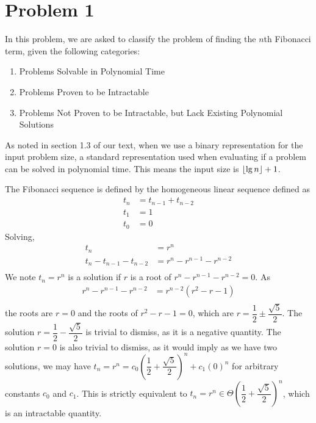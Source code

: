 \section*{Problem 1}

In this problem, we are asked to classify the problem of finding the $n$th Fibonacci term, given the following categories:
\begin{enumerate}
    \item Problems Solvable in Polynomial Time
    \item Problems Proven to be Intractable
    \item Problems Not Proven to be Intractable, but Lack Existing Polynomial Solutions
\end{enumerate}

As noted in section 1.3 of our text, when we use a binary representation for the input problem size, a standard representation used when evaluating if a problem can be solved in polynomial time. This means the input size is $\lfloor\lg n\rfloor + 1$.

The Fibonacci sequence is defined by the homogeneous linear sequence defined as
\begin{align*}
    t_n &= t_{n-1} + t_{n-2}\\
    t_1 &= 1\\
    t_0 &= 0
\end{align*}
Solving,
\begin{align*}
    t_n &= r^n\\
    t_n - t_{n-1} - t_{n-2} &= r^n - r^{n-1} - r^{n-2}\\
\end{align*}  
We note $t_n = r^n$ is a solution if $r$ is a root of $r^n - r^{n-1} - r^{n-2} = 0$. As
\begin{align*}  
    r^n - r^{n-1} - r^{n-2} &= r^{n-2}(r^2 - r - 1)\\
\end{align*}
the roots are $r = 0$ and the roots of $r^2 - r - 1 = 0$, which are $r = \dfrac{1}{2} \pm \dfrac{\sqrt{5}}{2}$. The solution $r = \dfrac{1}{2} - \dfrac{\sqrt{5}}{2}$ is trivial to dismiss, as it is a negative quantity. The solution $r = 0$ is also trivial to dismiss, as it would imply as we have two solutions, we may have $t_n = r^n = c_0\left(\dfrac{1}{2} + \dfrac{\sqrt{5}}{2}\right)^n + c_1(0)^n$ for arbitrary constants $c_0$ and $c_1$. This is strictly equivalent to $t_n = r^n \in \Theta\left(\dfrac{1}{2} + \dfrac{\sqrt{5}}{2}\right)^n$, which is an intractable quantity.
